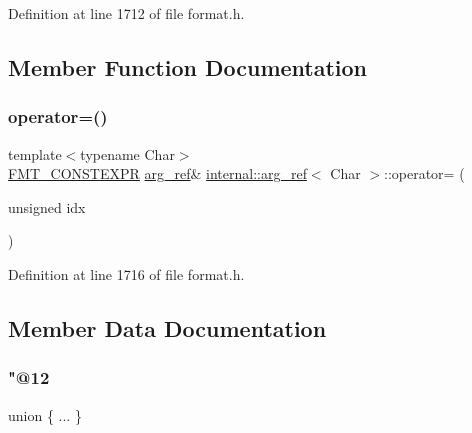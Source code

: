 Definition at line 1712 of file format.\+h.



\subsection{Member Function Documentation}
\mbox{\label{structinternal_1_1arg__ref_a927898d1d25eb9e65d631a9c50cf4f20}} 
\subsubsection{\texorpdfstring{operator=()}{operator=()}}
{\footnotesize\ttfamily template$<$typename Char$>$ \\
\hyperlink{core_8h_a69201cb276383873487bf68b4ef8b4cd}{F\+M\+T\+\_\+\+C\+O\+N\+S\+T\+E\+X\+PR} \hyperlink{structinternal_1_1arg__ref}{arg\+\_\+ref}\& \hyperlink{structinternal_1_1arg__ref}{internal\+::arg\+\_\+ref}$<$ Char $>$\+::operator= (\begin{DoxyParamCaption}\item[{unsigned}]{idx }\end{DoxyParamCaption})\hspace{0.3cm}{\ttfamily [inline]}}



Definition at line 1716 of file format.\+h.



\subsection{Member Data Documentation}
\mbox{\label{structinternal_1_1arg__ref_abd6f126760f04a7b6a8b7b5a5422390e}} 
\subsubsection{\texorpdfstring{"@12}{@12}}
{\footnotesize\ttfamily union \{ ... \} }

\mbox{\label{structinternal_1_1arg__ref_a888955ce30e4acb797f6a99d2eadb23e}} 

